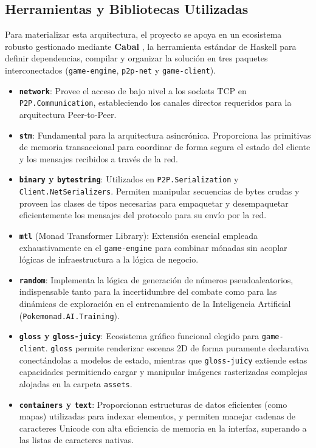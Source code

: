 \subsection{Herramientas y Bibliotecas Utilizadas}

Para materializar esta arquitectura, el proyecto se apoya en un ecosistema robusto gestionado mediante \textbf{Cabal} \cite{cabal_guide}, la herramienta estándar de Haskell para definir dependencias, compilar y organizar la solución en tres paquetes interconectados (\texttt{game-engine}, \texttt{p2p-net} y \texttt{game-client}).

\begin{itemize}
    \item \textbf{\texttt{network}}: Provee el acceso de bajo nivel a los sockets TCP en \texttt{P2P.Communication}, estableciendo los canales directos requeridos para la arquitectura Peer-to-Peer.
    \item \textbf{\texttt{stm}}: Fundamental para la arquitectura asincrónica. Proporciona las primitivas de memoria transaccional para coordinar de forma segura el estado del cliente y los mensajes recibidos a través de la red.
    \item \textbf{\texttt{binary} y \texttt{bytestring}}: Utilizados en \texttt{P2P.Serialization} y \texttt{Client.NetSerializers}. Permiten manipular secuencias de bytes crudas y proveen las clases de tipos necesarias para empaquetar y desempaquetar eficientemente los mensajes del protocolo para su envío por la red.
    \item \textbf{\texttt{mtl}} (Monad Transformer Library): Extensión esencial empleada exhaustivamente en el \texttt{game-engine} para combinar mónadas sin acoplar lógicas de infraestructura a la lógica de negocio.
    \item \textbf{\texttt{random}}: Implementa la lógica de generación de números pseudoaleatorios, indispensable tanto para la incertidumbre del combate como para las dinámicas de exploración en el entrenamiento de la Inteligencia Artificial (\texttt{Pokemonad.AI.Training}).
    \item \textbf{\texttt{gloss} y \texttt{gloss-juicy}}: Ecosistema gráfico funcional elegido para \texttt{game-client}. \texttt{gloss} permite renderizar escenas 2D de forma puramente declarativa conectándolas a modelos de estado, mientras que \texttt{gloss-juicy} extiende estas capacidades permitiendo cargar y manipular imágenes rasterizadas complejas alojadas en la carpeta \texttt{assets}.
    \item \textbf{\texttt{containers} y \texttt{text}}: Proporcionan estructuras de datos eficientes (como mapas) utilizadas para indexar elementos, y permiten manejar cadenas de caracteres Unicode con alta eficiencia de memoria en la interfaz, superando a las listas de caracteres nativas.
\end{itemize}

